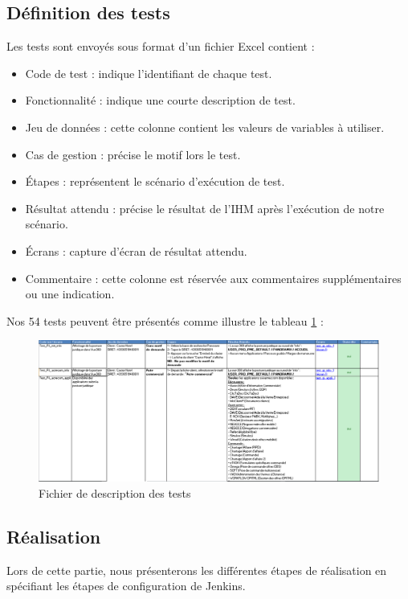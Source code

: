 \subsection{Définition des tests}
Les tests sont envoyés sous format d'un fichier Excel contient :
\begin{itemize}
	\item Code de test : indique l’identifiant de chaque test.
	\item Fonctionnalité : indique une courte description de test.
	\item Jeu de données : cette colonne contient les valeurs de variables à utiliser.
	\item Cas de gestion : précise le motif lors le test.
	\item Étapes : représentent le scénario d'exécution de test.
	\item Résultat attendu : précise le résultat de l’IHM après l'exécution de notre scénario.  
	\item Écrans : capture d’écran de résultat attendu.
	\item Commentaire : cette colonne est réservée aux commentaires supplémentaires ou une indication.
\end{itemize}\newpage
Nos 54 tests peuvent être présentés comme illustre le tableau \ref{fig:excel-robot} :
\begin{figure}[H]
	\centering
	\includegraphics[width=1\linewidth]{"img/excel robot"}
	\caption[Fichier de description des tests]{Fichier de description des tests}
	\label{fig:excel-robot}
\end{figure}
\subsection{Réalisation}
Lors de cette partie, nous présenterons les différentes étapes de réalisation en spécifiant les étapes de configuration de Jenkins.
